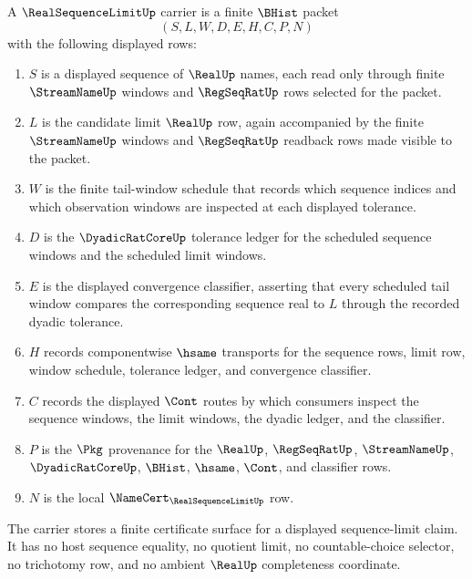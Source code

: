 \begin{definition}\label{def:real-sequence-limit-carrier}
A $\RealSequenceLimitUp$ carrier is a finite $\BHist$ packet
$$
(S,L,W,D,E,H,C,P,N)
$$
with the following displayed rows:
\begin{enumerate}
\item $S$ is a displayed sequence of $\RealUp$ names, each read only through finite $\StreamNameUp$ windows and $\RegSeqRatUp$ rows selected for the packet.
\item $L$ is the candidate limit $\RealUp$ row, again accompanied by the finite $\StreamNameUp$ windows and $\RegSeqRatUp$ readback rows made visible to the packet.
\item $W$ is the finite tail-window schedule that records which sequence indices and which observation windows are inspected at each displayed tolerance.
\item $D$ is the $\DyadicRatCoreUp$ tolerance ledger for the scheduled sequence windows and the scheduled limit windows.
\item $E$ is the displayed convergence classifier, asserting that every scheduled tail window compares the corresponding sequence real to $L$ through the recorded dyadic tolerance.
\item $H$ records componentwise $\hsame$ transports for the sequence rows, limit row, window schedule, tolerance ledger, and convergence classifier.
\item $C$ records the displayed $\Cont$ routes by which consumers inspect the sequence windows, the limit windows, the dyadic ledger, and the classifier.
\item $P$ is the $\Pkg$ provenance for the $\RealUp$, $\RegSeqRatUp$, $\StreamNameUp$, $\DyadicRatCoreUp$, $\BHist$, $\hsame$, $\Cont$, and classifier rows.
\item $N$ is the local $\NameCert_{\RealSequenceLimitUp}$ row.
\end{enumerate}
The carrier stores a finite certificate surface for a displayed sequence-limit claim. It has no host sequence equality, no quotient limit, no countable-choice selector, no trichotomy row, and no ambient $\RealUp$ completeness coordinate.
\end{definition}

